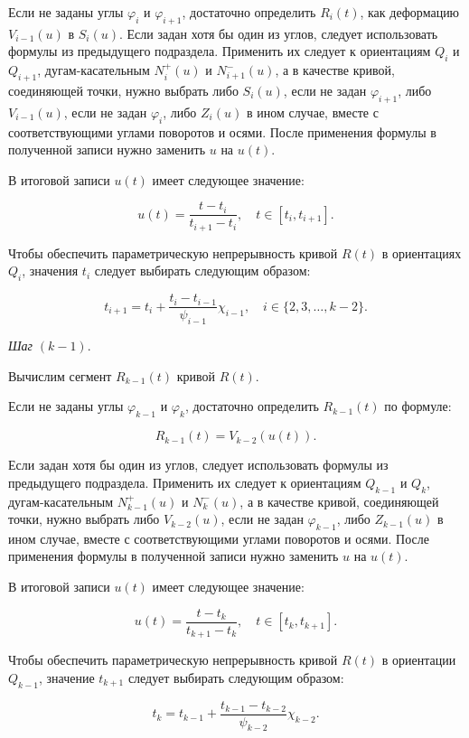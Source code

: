 Если не заданы углы $\varphi_i$ и $\varphi_{i+1}$, достаточно определить $R_i(t)$, как деформацию $V_{i-1}(u)$ в $S_i(u)$.
Если задан хотя бы один из углов, следует использовать формулы из предыдущего подраздела. Применить их следует к
ориентациям $Q_i$ и $Q_{i+1}$, дугам-касательным $N_i^+(u)$ и $N_{i+1}^-(u)$, а в качестве кривой, соединяющей точки,
нужно выбрать либо $S_i(u)$, если не задан $\varphi_{i+1}$, либо $V_{i-1}(u)$, если не задан $\varphi_i$, либо $Z_i(u)$
в ином случае, вместе с соответствующими углами поворотов и осями. После применения формулы в полученной записи нужно
заменить $u$ на $u(t)$.

В итоговой записи $u(t)$ имеет следующее значение:

$$
u(t)=\frac{t-t_i}{t_{i+1}-t_i}, \quad t \in [t_i,t_{i+1}].
$$

Чтобы обеспечить параметрическую непрерывность кривой $R(t)$ в ориентациях $Q_i$, значения $t_i$ следует выбирать
следующим образом:

$$
t_{i+1}=t_i+\frac{t_i-t_{i-1}}{\psi_{i-1}}\chi_{i-1}, \quad i \in \{2,3,\dots,k-2\}.
$$

\bigskip
\textit{Шаг} $(k-1)$.

Вычислим сегмент $R_{k-1}(t)$ кривой $R(t)$.

Если не заданы углы $\varphi_{k-1}$ и $\varphi_k$, достаточно определить $R_{k-1}(t)$ по формуле:

$$
R_{k-1}(t)=V_{k-2}(u(t)).
$$

Если задан хотя бы один из углов, следует использовать формулы из предыдущего подраздела. Применить их следует к
ориентациям $Q_{k-1}$ и $Q_k$, дугам-касательным $N_{k-1}^+(u)$ и $N_k^-(u)$, а в качестве кривой, соединяющей точки,
нужно выбрать либо $V_{k-2}(u)$, если не задан $\varphi_{k-1}$, либо $Z_{k-1}(u)$ в ином случае, вместе с соответствующими
углами поворотов и осями. После применения формулы в полученной записи нужно заменить $u$ на $u(t)$.

В итоговой записи $u(t)$ имеет следующее значение:

$$
u(t)=\frac{t-t_k}{t_{k+1}-t_k}, \quad t \in [t_k,t_{k+1}].
$$

Чтобы обеспечить параметрическую непрерывность кривой $R(t)$ в ориентации $Q_{k-1}$, значение $t_{k+1}$ следует выбирать
следующим образом:

$$
t_k=t_{k-1}+\frac{t_{k-1}-t_{k-2}}{\psi_{k-2}}\chi_{k-2}.
$$
